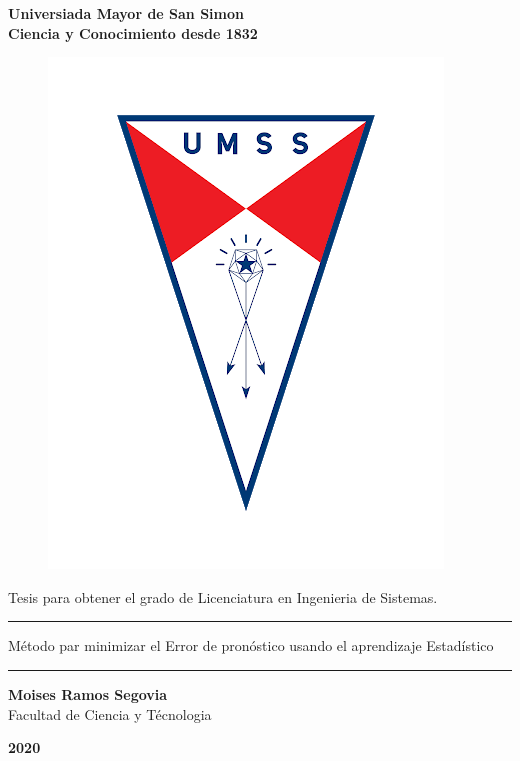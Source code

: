 \begin{titlepage}
	\begin{center}
		{\LARGE \textbf {Universiada Mayor de San Simon}}\\
		\vspace{0.25cm}
		{\large \textbf{Ciencia y Conocimiento desde 1832}}
		\vspace{0.25cm}
		\begin{figure}[h]
			\centering
			\includegraphics[scale=0.25]{imagenes/logo-umss.png}
		\end{figure}
	
		\vspace{1cm}
		
		{\large Tesis para obtener el grado de Licenciatura en Ingenieria de Sistemas.}
		
		\vspace{0.5cm}
		\textcolor{azul}{\rule{165mm}{0.5mm}}
		\vspace{2mm}
		\begin{spacing}{1.5}
			{\large Método par minimizar el Error de pronóstico usando el aprendizaje Estadístico}
		\end{spacing}	
		\vspace{1mm}
		\textcolor{azul}{\rule{165mm}{0.5mm}}
		
		\vspace{2cm}
		
		{\Large \textbf{Moises Ramos Segovia}}\\
		\vspace{5mm}
		{\Large Facultad de Ciencia y Técnologia}\\
		\vfill
		
		{\Huge \textbf{2020}}
	\end{center}
\end{titlepage}